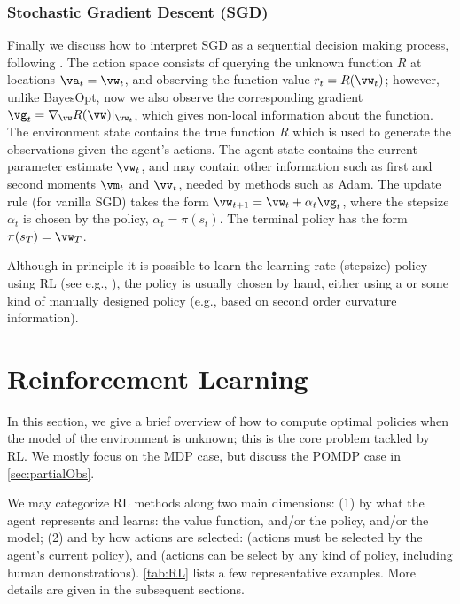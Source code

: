 \subsubsection{Stochastic Gradient Descent (SGD)}

Finally we discuss how to interpret SGD as a sequential decision making process,
following \citep{Powell2022}.
The action space  consists of querying the unknown function $R$ at
locations $\va_t=\vw_t$, and observing the function value $r_t=R(\vw_t)$;
however, unlike BayesOpt, now we also observe
the corresponding gradient $\vg_t = \nabla_{\vw} R(\vw)|_{\vw_t}$,
which gives non-local information about the function.
The environment state contains the true function $R$
which is used to generate the observations given the agent's actions.
The agent state contains the current parameter estimate
$\vw_t$, and may contain  other information such as first and second moments
$\vm_t$ and $\vv_t$,
needed by methods such as Adam.
The update rule (for vanilla SGD) takes the form
$\vw_{t+1}=\vw_t + \alpha_t \vg_t$,
where the stepsize $\alpha_t$ is chosen by the policy,
$\alpha_t=\pi(s_t)$.
The terminal policy has the form $\pi(s_T)=\vw_T$.

Although in principle it is possible to learn the learning rate (stepsize) policy
using RL (see e.g., \citep{Xu2017RL}), the policy is usually
chosen by hand, either using a 
or some kind of manually designed  policy
(e.g., based on second order curvature information).




\section{Reinforcement Learning}
\label{sec:RLoverview}


In this section, we give a
brief overview of how to compute
optimal policies when the model of the environment is unknown;
this is the core problem tackled by RL.
We mostly  focus on the MDP case, but discuss the POMDP case
in \cref{sec:partialObs}.

We may categorize RL methods along two main
dimensions:
(1) by what
the agent represents and learns:
the value function,
and/or the policy,
and/or the model;
(2) and by how actions are selected:
 (actions must be selected by the agent's
current policy),
and 
(actions can be select by any kind of policy,
including human demonstrations).
\cref{tab:RL} lists a few representative examples.
More details are given in the subsequent sections.


